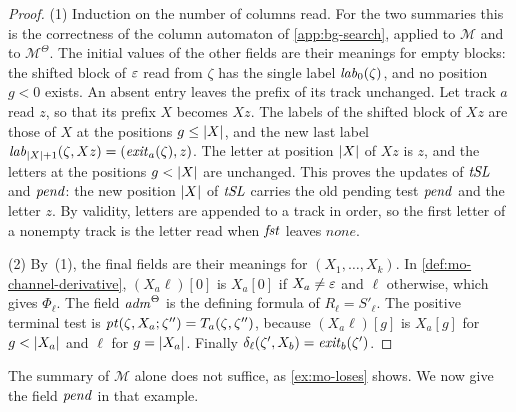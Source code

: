 \begin{proof}
(1) Induction on the number of columns read. For the two summaries this is
the correctness of the column automaton of \cref{app:bg-search}, applied to
$\mathcal M$ and to $\mathcal M^\Theta$. The initial values of the other fields
are their meanings for empty blocks: the shifted block of $\varepsilon$ read from
$\zeta$ has the single label $\mathit{lab}_0(\zeta)$, and no position $g<0$ exists. An
absent entry leaves the prefix of its track unchanged. Let track $a$ read $z$,
so that its prefix $X$ becomes $Xz$. The labels of the shifted block of $Xz$
are those of $X$ at the positions $g\le\lvert X\rvert$, and the new last label
$\mathit{lab}_{\lvert X\rvert+1}(\zeta,Xz)=(\mathit{exit}_a(\zeta),z)$. The letter at position $\lvert X\rvert$
of $Xz$ is $z$, and the letters at the positions $g<\lvert X\rvert$ are unchanged.
This proves the updates of $\mathit{tSL}$ and $\mathit{pend}$: the new position $\lvert X\rvert$ of
$\mathit{tSL}$ carries the old pending test $\mathit{pend}$ and the letter $z$. By validity,
letters are appended to a track in order, so the first letter of a nonempty
track is the letter read when $\mathit{fst}$ leaves $\mathit{none}$.

(2) By~(1), the final fields are their meanings for $(X_1,\ldots,X_k)$. In
\cref{def:mo-channel-derivative}, $(X_a\ell)[0]$ is $X_a[0]$ if $X_a\ne\varepsilon$ and
$\ell$ otherwise, which gives $\Phi_\ell$. The field $\mathit{adm}^\Theta$ is the
defining formula of $R_\ell=S'_\ell$. The positive terminal test is
$\mathit{pt}(\zeta,X_a;\zeta'')=T_a(\zeta,\zeta'')$, because $(X_a\ell)[g]$ is
$X_a[g]$ for $g<\lvert X_a\rvert$ and $\ell$ for $g=\lvert X_a\rvert$. Finally
$\delta_\ell(\zeta',X_b)=\mathit{exit}_b(\zeta')$.
\end{proof}

The summary of $\mathcal M$ alone does not suffice, as \cref{ex:mo-loses} shows.
We now give the field $\mathit{pend}$ in that example.

